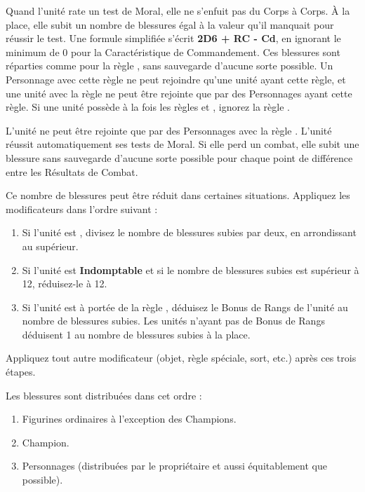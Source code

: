 \label{daemonicinstability}

Quand l'unité rate un test de Moral, elle ne s'enfuit pas du Corps à Corps. À la place, elle subit un nombre de blessures égal à la valeur qu'il manquait pour réussir le test. Une formule simplifiée s'écrit \textbf{2D6 + RC - Cd}, en ignorant le minimum de 0 pour la Caractéristique de Commandement. Ces blessures sont réparties comme pour la règle \unstable{}, sans sauvegarde d'aucune sorte possible. Un Personnage avec cette règle ne peut rejoindre qu'une unité ayant cette règle, et une unité avec la règle \daemonicinstability{} ne peut être rejointe que par des Personnages ayant cette règle. Si une unité possède à la fois les règles \daemonicinstability{} et \unstable{}, ignorez la règle \unstable{}.


L'unité ne peut être rejointe que par des Personnages avec la règle \unstable{}. L'unité réussit automatiquement ses tests de Moral. Si elle perd un combat, elle subit une blessure sans sauvegarde d'aucune sorte possible pour chaque point de différence entre les Résultats de Combat.

Ce nombre de blessures peut être réduit dans certaines situations. Appliquez les modificateurs dans l'ordre suivant :
\begin{enumerate}
\item Si l'unité est \textbf{\stubborn}, divisez le nombre de blessures subies par deux, en arrondissant au supérieur.
\item Si l'unité est \textbf{Indomptable} et si le nombre de blessures subies est supérieur à 12, réduisez-le à 12.
\item Si l'unité est à portée de la règle \textbf{\holdyourground}, déduisez le Bonus de Rangs de l'unité au nombre de blessures subies. Les unités n'ayant pas de Bonus de Rangs déduisent 1 au nombre de blessures subies à la place.
\end{enumerate}
Appliquez tout autre modificateur (objet, règle spéciale, sort, etc.) après ces trois étapes.

Les blessures sont distribuées dans cet ordre :
\begin{enumerate}
\item Figurines ordinaires à l'exception des Champions.
\item Champion.
\item Personnages (distribuées par le propriétaire et aussi équitablement que possible).
\end{enumerate}

